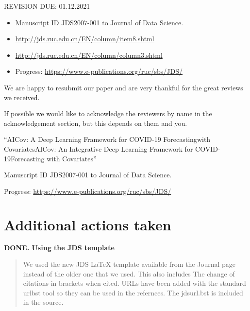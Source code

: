 




\newcommand{\REVIEW}[3]{
  \begin{tcolorbox}[colback={#1}]
    {\bf {#1}. {#2}}
 \end{tcolorbox}
  \begin{quote}
    {#3}
  \end{quote}
}

REVISION DUE: 01.12.2021

\begin{itemize}
\item Manuscript ID JDS2007-001 to Journal of Data Science.

\item \url{http://jds.ruc.edu.cn/EN/column/item8.shtml}

\item \url{http://jds.ruc.edu.cn/EN/column/column3.shtml}

\item Progress: \url{https://www.e-publications.org/ruc/sbs/JDS/} 

\end{itemize}



\bigskip

\parindent 0pt We are happy to resubmit our paper and are very thankful for the great reviews we received. 

If possible we would like to acknowledge the reviewers by name in the
acknowledgement section, but this depends on them and you.



``AICov: A Deep Learning Framework for COVID-19 Forecastingwith
CovariatesAICov: An Integrative Deep Learning Framework for
COVID-19Forecasting with Covariates''

Manuscript ID JDS2007-001 to Journal of Data Science.

Progress: \url{https://www.e-publications.org/ruc/sbs/JDS/} 



\section{Additional actions taken}


\REVIEW{DONE}{Using the JDS template} {We used the new JDS \LaTeX
  template available from the Journal page instead of the older one
  that we used. This also includes The change of citations in brackets
  when cited. URLs have been added with the standard urlbst tool so
  they can be used in the refernces. The jdsurl.bst is included in the
  source.}



